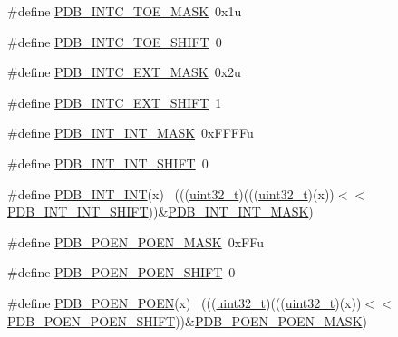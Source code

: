 \begin{DoxyCompactItemize}
\item 
\#define \hyperlink{group___p_d_b___register___masks_ga72fcf50548a0ad908e68c9dd67e61c2a}{P\+D\+B\+\_\+\+I\+N\+T\+C\+\_\+\+T\+O\+E\+\_\+\+M\+A\+SK}~0x1u
\item 
\#define \hyperlink{group___p_d_b___register___masks_ga48ed5e2759aea8d4b6a4a47f1993cacc}{P\+D\+B\+\_\+\+I\+N\+T\+C\+\_\+\+T\+O\+E\+\_\+\+S\+H\+I\+FT}~0
\item 
\#define \hyperlink{group___p_d_b___register___masks_ga012fb0606d68eca77a9b15c2b8b8c995}{P\+D\+B\+\_\+\+I\+N\+T\+C\+\_\+\+E\+X\+T\+\_\+\+M\+A\+SK}~0x2u
\item 
\#define \hyperlink{group___p_d_b___register___masks_ga94b6fffc0fb61e58e2436696dc674340}{P\+D\+B\+\_\+\+I\+N\+T\+C\+\_\+\+E\+X\+T\+\_\+\+S\+H\+I\+FT}~1
\item 
\#define \hyperlink{group___p_d_b___register___masks_ga04262fdbd8c3565c23a025cb119f1549}{P\+D\+B\+\_\+\+I\+N\+T\+\_\+\+I\+N\+T\+\_\+\+M\+A\+SK}~0x\+F\+F\+F\+Fu
\item 
\#define \hyperlink{group___p_d_b___register___masks_ga5b99cf0c9ae2fa2cf6e4200a7e3bf13b}{P\+D\+B\+\_\+\+I\+N\+T\+\_\+\+I\+N\+T\+\_\+\+S\+H\+I\+FT}~0
\item 
\#define \hyperlink{group___p_d_b___register___masks_ga9a3ae5bfc73156adbab6465646893347}{P\+D\+B\+\_\+\+I\+N\+T\+\_\+\+I\+NT}(x)                                                  ~(((\hyperlink{_p_e___types_8h_a33594304e786b158f3fb30289278f5af}{uint32\+\_\+t})(((\hyperlink{_p_e___types_8h_a33594304e786b158f3fb30289278f5af}{uint32\+\_\+t})(x))$<$$<$\hyperlink{group___p_d_b___register___masks_ga5b99cf0c9ae2fa2cf6e4200a7e3bf13b}{P\+D\+B\+\_\+\+I\+N\+T\+\_\+\+I\+N\+T\+\_\+\+S\+H\+I\+FT}))\&\hyperlink{group___p_d_b___register___masks_ga04262fdbd8c3565c23a025cb119f1549}{P\+D\+B\+\_\+\+I\+N\+T\+\_\+\+I\+N\+T\+\_\+\+M\+A\+SK})
\item 
\#define \hyperlink{group___p_d_b___register___masks_gadff2842454cba42f94cc2568cd20df3d}{P\+D\+B\+\_\+\+P\+O\+E\+N\+\_\+\+P\+O\+E\+N\+\_\+\+M\+A\+SK}~0x\+F\+Fu
\item 
\#define \hyperlink{group___p_d_b___register___masks_ga00643f248ccf8b14021f9983f0e32ac8}{P\+D\+B\+\_\+\+P\+O\+E\+N\+\_\+\+P\+O\+E\+N\+\_\+\+S\+H\+I\+FT}~0
\item 
\#define \hyperlink{group___p_d_b___register___masks_ga276eca07e19cae6eb9b9a740420733c7}{P\+D\+B\+\_\+\+P\+O\+E\+N\+\_\+\+P\+O\+EN}(x)                                              ~(((\hyperlink{_p_e___types_8h_a33594304e786b158f3fb30289278f5af}{uint32\+\_\+t})(((\hyperlink{_p_e___types_8h_a33594304e786b158f3fb30289278f5af}{uint32\+\_\+t})(x))$<$$<$\hyperlink{group___p_d_b___register___masks_ga00643f248ccf8b14021f9983f0e32ac8}{P\+D\+B\+\_\+\+P\+O\+E\+N\+\_\+\+P\+O\+E\+N\+\_\+\+S\+H\+I\+FT}))\&\hyperlink{group___p_d_b___register___masks_gadff2842454cba42f94cc2568cd20df3d}{P\+D\+B\+\_\+\+P\+O\+E\+N\+\_\+\+P\+O\+E\+N\+\_\+\+M\+A\+SK})

\end{DoxyCompactItemize}
